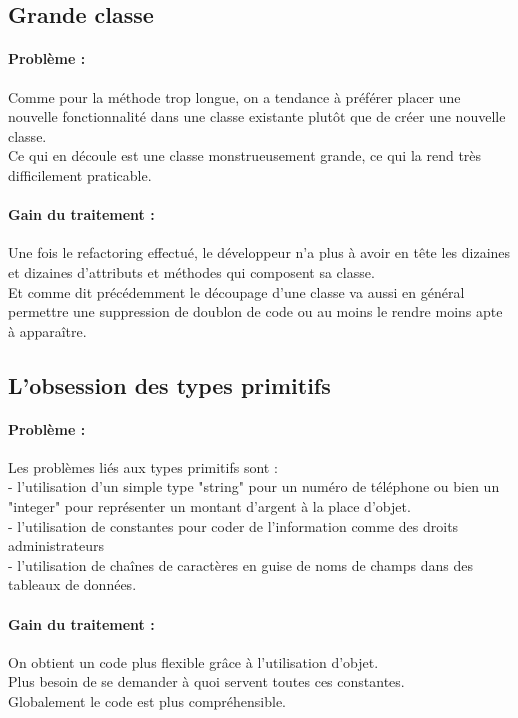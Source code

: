 \documentclass[a4paper,twoside,12pt,openright]{report}
\begin{document}
\subsection{Grande classe}
\paragraph{Problème :}
Comme pour la méthode trop longue, on a tendance à préférer placer une nouvelle fonctionnalité dans une classe existante plutôt que de créer une nouvelle classe.\\
Ce qui en découle est une classe monstrueusement grande, ce qui la rend très difficilement praticable.\\

\paragraph{Gain du traitement :}
Une fois le refactoring effectué, le développeur n'a plus à avoir en tête les dizaines et dizaines d'attributs et méthodes qui composent sa classe.\\
Et comme dit précédemment le découpage d'une classe va aussi en général permettre une suppression de doublon de code ou au moins le rendre moins apte à apparaître.\\

\subsection{L'obsession des types primitifs}
\paragraph{Problème :}
Les problèmes liés aux types primitifs sont :\\
- l'utilisation d'un simple type "string" pour un numéro de téléphone ou bien un "integer" pour représenter un montant d'argent à la place d'objet.\\
- l'utilisation de constantes pour coder de l'information comme des droits administrateurs\\
- l'utilisation de chaînes de caractères en guise de noms de champs dans des tableaux de données.\\

\paragraph{Gain du traitement :}
On obtient un code plus flexible grâce à l'utilisation d'objet.\\
Plus besoin de se demander à quoi servent toutes ces constantes.\\
Globalement le code est plus compréhensible.\\
\end{document}
